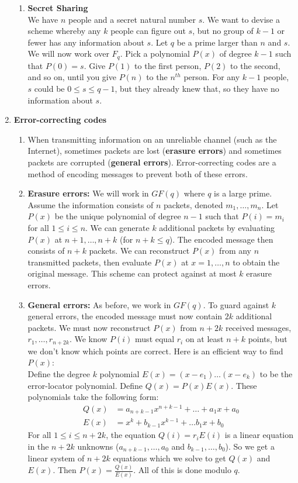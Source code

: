 \documentclass[10pt]{article}
\begin{document}
\begin{multicols}{2}
\begin{enumerate}
\begin{enumerate}
    \item \textbf{Secret Sharing} \\
    We have $n$ people and a secret natural number $s$. We want to devise a scheme whereby any $k$ people can figure out $s$, but no group of $k-1$ or fewer has any information about $s$. Let $q$ be a prime larger than $n$ and $s$. We will now work over $F_q$. Pick a polynomial $P(x)$ of degree $k-1$ such that $P(0)=s$. Give $P(1)$ to the first person, $P(2)$ to the second, and so on, until you give $P(n)$ to the $n^{th}$ person. For any $k-1$ people, $s$ could be $0 \leq s \leq q-1$, but they already knew that, so they have no information about $s$. 
    \end{enumerate}
    
    \item \textbf{Error-correcting codes}
    \begin{enumerate}
        \item When transmitting information on an unreliable channel (such as the Internet), sometimes packets are lost (\textbf{erasure errors}) and sometimes packets are corrupted (\textbf{general errors}). Error-correcting codes are a method of encoding messages to prevent both of these errors.
        \item \textbf{Erasure errors:} We will work in $GF(q)$ where $q$ is a large prime. Assume the information consists of $n$ packets, denoted $m_1,\hdots,m_n$. Let $P(x)$ be the unique polynomial of degree $n-1$ such that $P(i)=m_i$ for all $1 \leq i \leq n$. We can generate $k$ additional packets by evaluating $P(x)$ at $n+1,\hdots,n+k$ (for $n+k \leq q$). The encoded message then consists of $n+k$ packets. We can reconstruct $P(x)$ from any $n$ transmitted packets, then evaluate $P(x)$ at $x=1,\hdots,n$ to obtain the original message. This scheme can protect against at most $k$ erasure errors.
        \item \textbf{General errors:} As before, we work in $GF(q)$. To guard against $k$ general errors, the encoded message must now contain $2k$ additional packets. We must now reconstruct $P(x)$ from $n+2k$ received messages, $r_1,\hdots,r_{n+2k}$. We know $P(i)$ must equal $r_i$ on at least $n+k$ points, but we don't know which points are correct. Here is an efficient way to find $P(x)$: \\ Define the degree $k$ polynomial $E(x)=(x-e_1) \ldots (x-e_k)$ to be the error-locator polynomial. Define $Q(x)=P(x)E(x)$. These polynomials take the following form:
        \begin{align*}
            Q(x)&=a_{n+k-1}x^{n+k-1}+\hdots+a_1x+a_0 \\
            E(x)&=x^k+b_{k-1}x^{k-1}+\hdots b_1x+b_0
        \end{align*}
        For all $1 \leq i \leq n+2k$, the equation $Q(i)=r_iE(i)$ is a linear equation in the $n+2k$ unknowns ($a_{n+k-1},\hdots,a_0$ and $b_{k-1},\hdots,b_0$). So we get a linear system of $n+2k$ equations which we solve to get $Q(x)$ and $E(x)$. Then $P(x)=\frac{Q(x)}{E(x)}$. All of this is done modulo $q$.
    \end{enumerate}
        

\end{enumerate}
\end{multicols}
\end{document}
